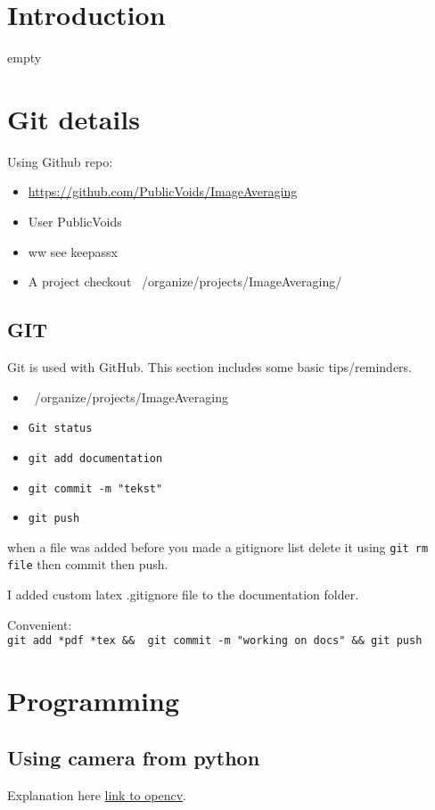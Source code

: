 \documentclass[10pt,a4paper]{report}
\author{Jeroen Keizer}
\begin{document}
\chapter{Introduction}
empty
\chapter{Git details}
Using Github repo:
\begin{itemize}
\item \url{https://github.com/PublicVoids/ImageAveraging}
\item User PublicVoids
\item ww see keepassx
\item A project checkout  ~/organize/projects/ImageAveraging/
\end{itemize}
\section{GIT}
Git is used with GitHub.
This section includes some basic tips/reminders.
\begin{itemize}
\item ~/organize/projects/ImageAveraging
\item \verb|Git status|
\item \verb|git add documentation|
\item \verb|git commit -m "tekst"|
\item \verb|git push|
\end{itemize}
when a file was added before you made a gitignore list delete it using \verb|git rm file| then commit then push.

I added custom latex .gitignore file to the documentation folder.

Convenient:\\
\verb|git add *pdf *tex &&  git commit -m "working on docs" && git push|


\chapter{Programming}
\section{Using camera from python}
Explanation here
\href{http://opencv-python-tutroals.readthedocs.org/en/latest/py_tutorials/py_gui/py_video_display/py_video_display.html}{link to opencv}.
\end{document}
